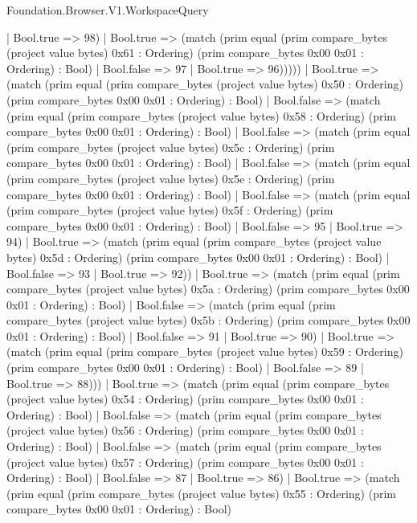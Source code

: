 \begin{lexlean}{Foundation.Browser.V1.WorkspaceQuery}
\begin{semanticmodule}
{                    | Bool.true => 98)
                  | Bool.true => (match (prim equal (prim compare_bytes (project value bytes) 0x61 : Ordering) (prim compare_bytes 0x00 0x01 : Ordering) : Bool)
                    | Bool.false => 97
                    | Bool.true => 96)))))
          | Bool.true => (match (prim equal (prim compare_bytes (project value bytes) 0x50 : Ordering) (prim compare_bytes 0x00 0x01 : Ordering) : Bool)
            | Bool.false => (match (prim equal (prim compare_bytes (project value bytes) 0x58 : Ordering) (prim compare_bytes 0x00 0x01 : Ordering) : Bool)
              | Bool.false => (match (prim equal (prim compare_bytes (project value bytes) 0x5c : Ordering) (prim compare_bytes 0x00 0x01 : Ordering) : Bool)
                | Bool.false => (match (prim equal (prim compare_bytes (project value bytes) 0x5e : Ordering) (prim compare_bytes 0x00 0x01 : Ordering) : Bool)
                  | Bool.false => (match (prim equal (prim compare_bytes (project value bytes) 0x5f : Ordering) (prim compare_bytes 0x00 0x01 : Ordering) : Bool)
                    | Bool.false => 95
                    | Bool.true => 94)
                  | Bool.true => (match (prim equal (prim compare_bytes (project value bytes) 0x5d : Ordering) (prim compare_bytes 0x00 0x01 : Ordering) : Bool)
                    | Bool.false => 93
                    | Bool.true => 92))
                | Bool.true => (match (prim equal (prim compare_bytes (project value bytes) 0x5a : Ordering) (prim compare_bytes 0x00 0x01 : Ordering) : Bool)
                  | Bool.false => (match (prim equal (prim compare_bytes (project value bytes) 0x5b : Ordering) (prim compare_bytes 0x00 0x01 : Ordering) : Bool)
                    | Bool.false => 91
                    | Bool.true => 90)
                  | Bool.true => (match (prim equal (prim compare_bytes (project value bytes) 0x59 : Ordering) (prim compare_bytes 0x00 0x01 : Ordering) : Bool)
                    | Bool.false => 89
                    | Bool.true => 88)))
              | Bool.true => (match (prim equal (prim compare_bytes (project value bytes) 0x54 : Ordering) (prim compare_bytes 0x00 0x01 : Ordering) : Bool)
                | Bool.false => (match (prim equal (prim compare_bytes (project value bytes) 0x56 : Ordering) (prim compare_bytes 0x00 0x01 : Ordering) : Bool)
                  | Bool.false => (match (prim equal (prim compare_bytes (project value bytes) 0x57 : Ordering) (prim compare_bytes 0x00 0x01 : Ordering) : Bool)
                    | Bool.false => 87
                    | Bool.true => 86)
                  | Bool.true => (match (prim equal (prim compare_bytes (project value bytes) 0x55 : Ordering) (prim compare_bytes 0x00 0x01 : Ordering) : Bool)
}
\end{semanticmodule}
\end{lexlean}

